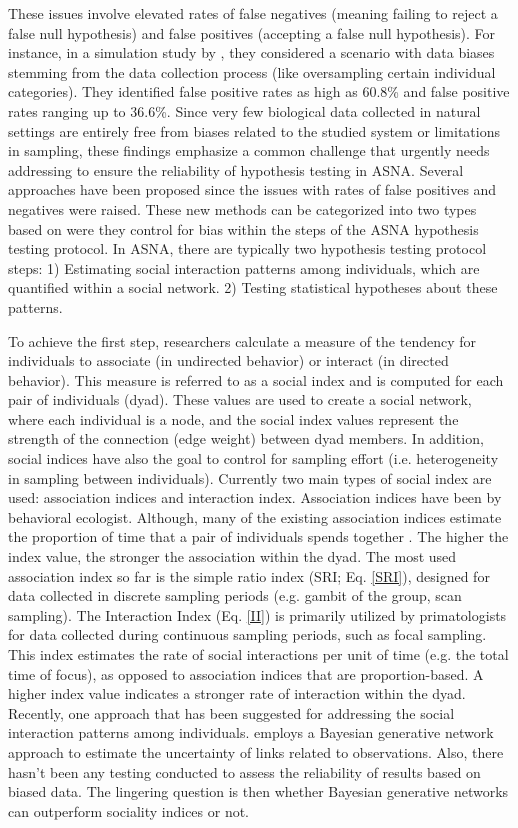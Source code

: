 \documentclass[Afour,sageh,times]{sagej}
\begin{document}
These issues involve elevated rates of false negatives (meaning failing to reject a false null hypothesis) and false positives (accepting a false null hypothesis). For instance, in a simulation study by \citet{Puga2021}, they considered a scenario with data biases stemming from the data collection process (like oversampling certain individual categories). They identified false positive rates as high as 60.8\% and false positive rates ranging up to 36.6\%. Since very few biological data collected in natural settings are entirely free from biases related to the studied system or limitations in sampling, these findings emphasize a common challenge that urgently needs addressing to ensure the reliability of hypothesis testing in ASNA. Several approaches have been proposed since the issues with rates of false positives and negatives were raised. These new methods can be categorized into two types based on were they control for bias within the steps of the ASNA hypothesis testing protocol. In ASNA, there are typically two hypothesis testing protocol steps: 1) Estimating social interaction patterns among individuals, which are quantified within a social network. 2) Testing statistical hypotheses about these patterns.

To achieve the first step, researchers calculate a measure of the tendency for individuals to associate (in undirected behavior) or interact (in directed behavior). This measure is referred to as a social index and is computed for each pair of individuals (dyad). These values are used to create a social network, where each individual is a node, and the social index values represent the strength of the connection (edge weight) between dyad members. In addition, social indices have also the goal to control for sampling effort (i.e. heterogeneity in sampling between individuals). Currently two main types of social index are used: association indices \citep{hubalek1982coefficients, sailer1984proximity} and interaction index. Association indices have been by behavioral ecologist. Although, many of the existing association indices estimate the proportion of time that a pair of individuals spends together \citep{whitehead2008analyzing}. 
The higher the index value, the stronger the association within the dyad. The most used association index so far is the simple ratio index (SRI; Eq. \ref{SRI}), designed for data collected in discrete sampling periods (e.g. gambit of the group, scan sampling). The Interaction Index (Eq. \ref{II}) is primarily utilized by primatologists for data collected during continuous sampling periods, such as focal sampling. This index estimates the rate of social interactions per unit of time (e.g. the total time of focus), as opposed to association indices that are proportion-based. A higher index value indicates a stronger rate of interaction within the dyad. Recently, one approach that has been suggested for addressing the social interaction patterns among individuals. \citet{hart2023bison} employs a Bayesian generative network approach to estimate the uncertainty of links related to observations. Also, there hasn't been any testing conducted to assess the reliability of results based on biased data. The lingering question is then whether Bayesian generative networks can outperform sociality indices or not.
\end{document}
